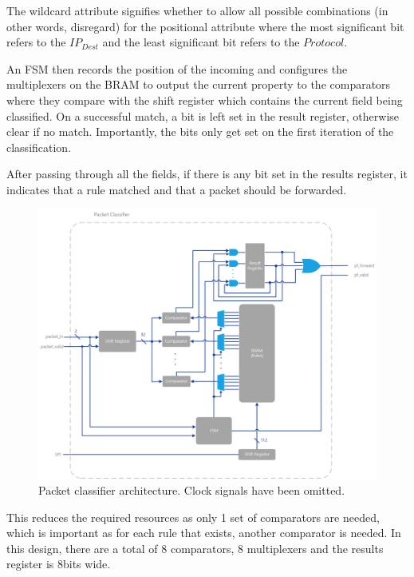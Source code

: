 \noindent The wildcard attribute signifies whether to allow all possible combinations (in other words, disregard) for the positional attribute where the most significant bit refers to the $IP_{Dest}$ and the least significant bit refers to the $Protocol$.

An FSM then records the position of the incoming and configures the multiplexers on the BRAM to output the current property to the comparators where they compare with the shift register which contains the current field being classified. On a successful match, a bit is left set in the result register, otherwise clear if no match. Importantly, the bits only get set on the first iteration of the classification. 

After passing through all the fields, if there is any bit set in the results register, it indicates that a rule matched and that a packet should be forwarded. 


\begin{figure}[h!]
    \centering
    \includegraphics[width=1\textwidth]{Images/PacketFilterArchitecture.png}
    \caption[Packet classifier architecture]{Packet classifier architecture. Clock signals have been omitted.}
    \label{fig:packet_classifier_architecture}
\end{figure}

\noindent This reduces the required resources as only 1 set of comparators are needed, which is important as for each rule that exists, another comparator is needed. In this design, there are a total of 8 comparators, 8 multiplexers and the results register is 8bits wide. 


